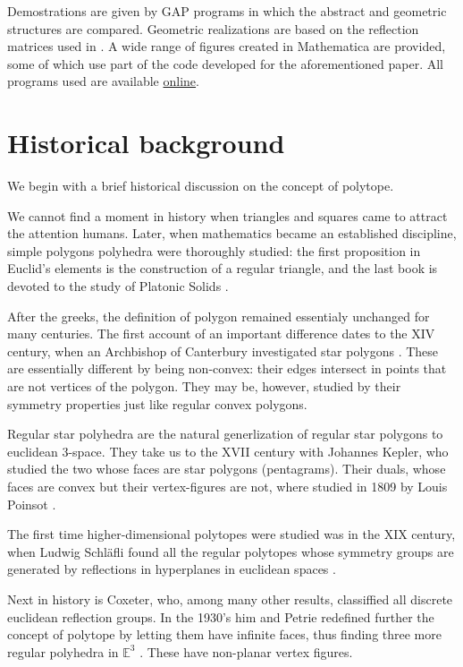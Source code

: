 \documentclass{article}
\theoremstyle{definition}
\newcommand{\E}{\mathbb{E}}
\begin{document}
	Demostrations are given by GAP programs in which the abstract and geometric structures are compared. Geometric realizations are based on the reflection matrices used in \cite{petcox}. A wide range of figures created in Mathematica are provided, some of which use part of the code developed for the aforementioned paper. All programs used are available \href{github.com/danimalabares/tesina}{online}.
	
	\section{Historical background}
	We begin with a brief historical discussion on the concept of polytope.
	
	We cannot find a moment in history when triangles and squares came to attract the attention humans. Later, when mathematics became an established discipline, simple polygons polyhedra were thoroughly studied: the first proposition in Euclid's elements is the construction of a regular triangle, and the last book is devoted to the study of Platonic Solids \cite{euclid}.
	
	After the greeks, the definition of polygon remained essentialy unchanged for many centuries. The first account of an important difference dates to the XIV century, when an Archbishop of Canterbury investigated star polygons \cite{abstract-polytopes}.
	These are essentially different by being non-convex: their edges intersect in points that are not vertices of the polygon. They may be, however, studied by their symmetry properties just like regular convex polygons.
	
	Regular star polyhedra are the natural generlization of regular star polygons to euclidean 3-space. They take us to the XVII century with Johannes Kepler, who studied the two whose faces are star polygons (pentagrams). Their duals, whose faces are convex but their vertex-figures are not, where studied in 1809 by Louis Poinsot \cite{abstract-polytopes}.
	
	The first time higher-dimensional polytopes were studied was in the XIX century, when Ludwig Schläfli found all the regular polytopes whose symmetry groups are generated by reflections in hyperplanes in euclidean spaces \cite{abstract-polytopes}.
	
	Next in history is Coxeter, who, among many other results, classiffied all discrete euclidean reflection groups. In the 1930's him and Petrie redefined further the concept of polytope by letting them have infinite faces, thus finding three more regular polyhedra in $\E^3$ \cite{regular-skew}. These have non-planar vertex figures.
	
\end{document}
